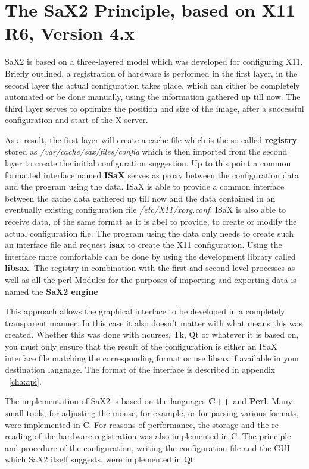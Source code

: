 \chapter{The SaX2 Principle, based on X11 R6, Version 4.x}
\label{cha:dsp}
\minitoc
SaX2 is based on a three-layered model which was
developed for configuring X11. Briefly outlined, a registration of
hardware is performed in the first layer, in the second layer the actual
configuration takes place, which can either be completely automated or be
done manually, using the information gathered up till now. The third layer
serves to optimize the position and size of the image, after a successful
configuration and start of the X server.

As a result, the first layer will create a cache file which is the so called
\textbf{registry} stored as \textit{/var/cache/sax/files/config} which is
then imported from the second
layer to create the initial configuration suggestion. Up to this point
a common formatted interface named \textbf{ISaX} serves as proxy between
the configuration data and the program using the data. ISaX is able to
provide a common interface between the cache data gathered up till now and
the data contained in an eventually existing configuration file
\textit{/etc/X11/xorg.conf}. ISaX is also able to receive data, of the same
format as it is abel to provide, to create or modify the actual configuration
file. The program using the data only needs to create such an interface
file and request \textbf{isax} to create the X11 configuration. Using the
interface more comfortable can be done by using the development
library called \textbf{libsax}. The registry in combination with the
first and second level processes as well as all the perl Modules for the
purposes of importing and exporting data is named the \textbf{SaX2 engine}

This approach allows the graphical interface to be developed in a completely
transparent manner. In this case it also doesn't matter with what means
this was created. Whether this was done with ncurses, Tk, Qt or whatever it
is based on, you must only ensure that the result of the configuration is 
either an ISaX interface file matching the corresponding format or use libsax
if available in your destination language. The format of the interface is
described in appendix ~\ref{cha:api}.

The implementation of SaX2 is based on the languages 
\textbf{C++} and \textbf{Perl}. Many small tools, for adjusting the mouse, for
example, or for parsing various formats, were implemented in C. For reasons of
performance, the storage and the re-reading of the hardware registration was
also implemented in C. The principle and procedure of the configuration,
writing the configuration file and the GUI which SaX2 itself suggests, were
implemented in Qt.

